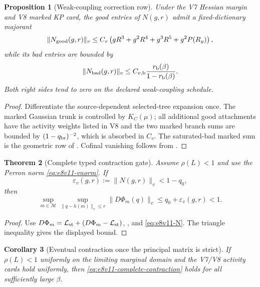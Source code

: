 \documentclass[11pt,oneside]{book}
\newtheorem{theorem}{Theorem}[chapter]
\newtheorem{proposition}[theorem]{Proposition}
\newtheorem{corollary}[theorem]{Corollary}
\theoremstyle{definition}
\theoremstyle{remark}
\begin{document}
\begin{proposition}[Weak-coupling correction row]
\label{prop:e8v11-N-small}
Under the V7 Hessian margin and V8 marked KP card, the good entries of
\(N(g,r)\) admit a fixed-dictionary majorant
\[
 \|N_{\rm good}(g,r)\|_v
 \le C_v\left(
 gR^3+g^2R^4+g^3R^5+g^2P(R_y)
 \right),                                           \label{eq:e8v11-Ngood}
\]
while its bad entries are bounded by
\[
 \|N_{\rm bad}(g,r)\|_v
 \le C_{v,{\rm b}}\frac{r_{\rm b}(\beta)}
                         {1-r_{\rm b}(\beta)}.       \label{eq:e8v11-Nbad}
\]
Both right sides tend to zero on the declared weak-coupling schedule.
\end{proposition}

\begin{proof}
Differentiate the source-dependent selected-tree expansion once.
The marked Gaussian trunk is controlled by \(K_C(\mu)\); all
additional good attachments have the activity weights listed in V8
and the two marked branch sums are bounded by
\((1-q_{\rm br})^{-2}\), which is absorbed in \(C_v\).
The saturated-bad marked sum is the geometric row of
.  Cofinal vanishing follows from
.
\end{proof}

\begin{theorem}[Complete typed contraction gate]
\label{thm:e8v11-complete-gate}
Assume \(\rho(L)<1\) and use the Perron norm
\eqref{eq:e8v11-vnorm}.  If
\[
 \varepsilon_v(g,r):=\|N(g,r)\|_v<1-q_0,            \label{eq:e8v11-epsilon-gate}
\]
then
\[
 \sup_{m\in{\mathcal M}}
 \sup_{\|q-h(m)\|_v\le r}
 \|D\Phi_m(q)\|_v
 \le q_0+\varepsilon_v(g,r)<1.                      \label{eq:e8v11-complete-contraction}
\]
\end{theorem}

\begin{proof}
Use
\(D\Phi_m={\cal L}_{\rm st}+
(D\Phi_m-{\cal L}_{\rm st})\),
, and
\eqref{eq:e8v11-N}.  The triangle inequality gives the displayed
bound.
\end{proof}

\begin{corollary}[Eventual contraction once the principal matrix is
strict]
\label{cor:e8v11-eventual}
If \(\rho(L)<1\) uniformly on the limiting marginal domain and the
V7/V8 activity cards hold uniformly, then
\eqref{eq:e8v11-complete-contraction} holds for all sufficiently large
\(\beta\).
\end{corollary}
\end{document}
